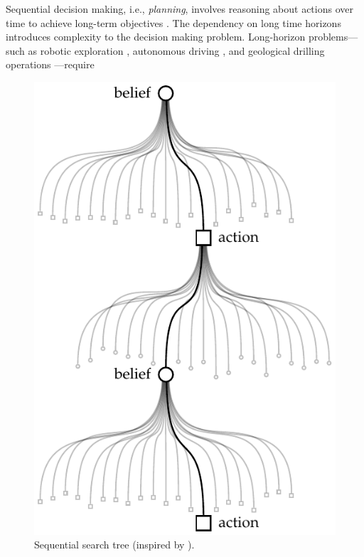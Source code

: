 Sequential decision making, i.e., \textit{planning}, involves reasoning about actions over time to achieve long-term objectives \cite{dmbook}.
The dependency on long time horizons introduces complexity to the decision making problem.
Long-horizon problems---such as robotic exploration \cite{balaban2020health}, autonomous driving \cite{huang2018hybrid}, and geological drilling operations \cite{mern2023intelligent}---require
\begin{figure}
    \begin{center}
        \includegraphics[width=\linewidth]{diagrams/introduction/sequential-search-tree.pdf}
    \end{center}
    \vspace*{-4mm}
    \caption{Sequential search tree (inspired by \textcite{alphago2017movie}).}
    \label{fig:sequential_search_tree}
    \vspace*{-2mm}
\end{figure}
